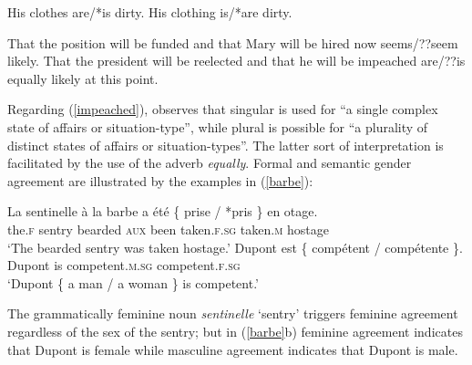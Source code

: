 \documentclass[output=paper
 	        ,biblatex
                ,babelshorthands
                ,newtxmath
                ,draftmode
                ,colorlinks, citecolor=brown
]{langscibook}
\begin{document}
\begin{exe} 
\ex \label{clothes}
 \begin{xlist}
\ex   His clothes are/*is dirty.
\ex   His clothing is/*are dirty.
\end{xlist}
\end{exe}

\begin{exe} 
\ex \label{impeached}
 \begin{xlist}
\ex   That the position will be funded and that Mary will be hired now seems/??seem likely.
\ex  	That the president will be reelected and that he will be impeached are/??is equally likely at this point.
\end{xlist}
\end{exe}

\noindent
Regarding (\ref{impeached}), \citet[564--565]{Mccloskey:1991} observes that singular is used for ``a single complex state of affairs or situation-type'', while plural is possible for ``a plurality of distinct states of affairs or situation-types''.  The latter sort of interpretation is facilitated by the use of the adverb \textit{equally}.   Formal and semantic gender agreement are illustrated by the  examples in (\ref{barbe}):

\begin{exe} 
\ex \label{barbe}
 \begin{xlist}
\ex   
\gll   La sentinelle	{\`{a} la barbe}	a \'{e}t\'{e}	\{ prise / *pris \} 	{en otage}.  \\
		the.\textsc{f} sentry	bearded	\textsc{aux} been	
		{} taken.\textsc{f.sg} {} taken.\textsc{m}	 {} hostage \\
\glt		`The bearded sentry was taken hostage.’
\ex   
\gll   Dupont	est	\{ comp\'{e}tent /		comp\'{e}tente \}. \\
		Dupont	is	{} competent.\textsc{m.sg} {}	competent.\textsc{f.sg} {} \\
\glt		`Dupont \{ a man / a woman \} is competent.’
 \end{xlist}
\end{exe} 

\noindent
The grammatically feminine noun \textit{sentinelle} `sentry'  triggers feminine agreement regardless of the sex of the sentry; but in (\ref{barbe}b) feminine agreement indicates that Dupont is female while masculine agreement indicates that Dupont is male.  
\end{document}

